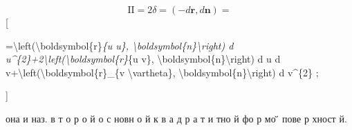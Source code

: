 \documentclass[10pt]{article}
\begin{document}
\[

\mathrm{II}=2 \delta=(-d \boldsymbol{r}, d \boldsymbol{n})=

\][



=\textbackslash left(\textbackslash boldsymbol\{r\}\textit{\{u u\}, \textbackslash boldsymbol\{n\}\textbackslash right) d u\^{}\{2\}+2\textbackslash left(\textbackslash boldsymbol\{r\}}\{u v\}, \textbackslash boldsymbol\{n\}\textbackslash right) d u d v+\textbackslash left(\textbackslash boldsymbol\{r\}\_\{v \textbackslash vartheta\}, \textbackslash boldsymbol\{n\}\textbackslash right) d v\^{}\{2\} ;

]



она и наз. в т о р о й о с новн о й к в а д р а т и тно й фо р мо ̆̈ пове р хност й.
\end{document}
